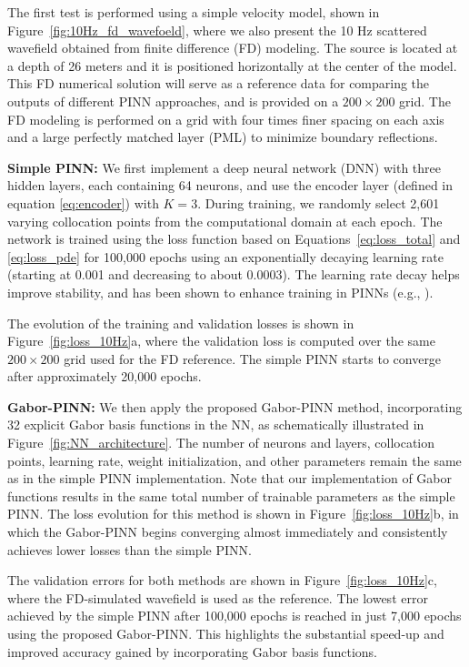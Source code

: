 \documentclass[authoryear, preprint, 12pt]{elsarticle}
\begin{document}
	The first test is performed using a simple velocity model, shown in Figure~\ref{fig:10Hz_fd_wavefoeld}, where we also present the 10 Hz scattered wavefield obtained from finite difference (FD) modeling. The source is located at a depth of 26 meters and it is positioned horizontally at the center of the model. This FD numerical solution will serve as a reference data for comparing the outputs of different PINN approaches, and is provided on a \(200 \times 200\) grid. The FD modeling is performed on a grid with four times finer spacing on each axis and a large perfectly matched layer (PML) to minimize boundary reflections.
	

\textbf{Simple PINN: }We first implement a deep neural network (DNN) with three hidden layers, each containing 64 neurons, and use the encoder layer (defined in equation \ref{eq:encoder}) with \(K=3\). During training, we randomly select 2,601 varying collocation points from the computational domain at each epoch. The network is trained using the loss function based on Equations~\eqref{eq:loss_total} and \eqref{eq:loss_pde} for 100,000 epochs using an exponentially decaying learning rate (starting at 0.001 and decreasing to about 0.0003). The learning rate decay helps improve stability, and has been shown to enhance training in PINNs (e.g., \cite{bihlo2024improving, xu2024preprocessing}).

The evolution of the training and validation losses is shown in Figure~\ref{fig:loss_10Hz}a, where the validation loss is computed over the same \(200 \times 200\) grid used for the FD reference. The simple PINN starts to converge after approximately 20,000 epochs.
	

	\textbf{Gabor-PINN: }We then apply the proposed Gabor-PINN method, incorporating 32 explicit Gabor basis functions in the NN, as schematically  illustrated in Figure~\ref{fig:NN_architecture}. The number of neurons and layers, collocation points, learning rate, weight initialization, and other parameters remain the same as in the simple PINN implementation. Note that our implementation of Gabor functions results in the same total number of trainable parameters as the simple PINN. The loss evolution for this method is shown in Figure~\ref{fig:loss_10Hz}b, in which the Gabor-PINN begins converging almost immediately and consistently achieves lower losses than the simple PINN.
	
	The validation errors for both methods are shown in Figure~\ref{fig:loss_10Hz}c, where the FD-simulated wavefield is used as the reference. The lowest error achieved by the simple PINN after 100,000 epochs is reached in just 7,000 epochs using the proposed Gabor-PINN. This highlights the substantial speed-up and improved accuracy gained by incorporating Gabor basis functions. 
	
\end{document}
